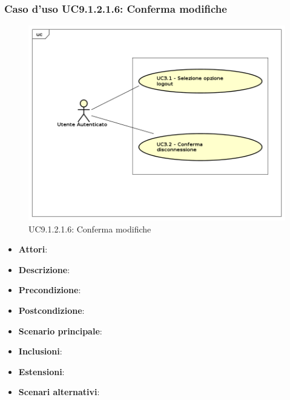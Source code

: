 					\subsubsection{Caso d'uso UC9.1.2.1.6: Conferma modifiche}
					\label{UC9.1.2.1.6}
					\begin{figure}[h]
						\centering
					\includegraphics[scale=0.7,keepaspectratio]{UML/UC9.png}
						\caption{UC9.1.2.1.6: Conferma modifiche}
					\end{figure}
					\FloatBarrier
					\begin{itemize}
						\item \textbf{Attori}: 
						\item \textbf{Descrizione}: 
						\item \textbf{Precondizione}: 
						\item \textbf{Postcondizione}: 
						\item \textbf{Scenario principale}:
						\item \textbf{Inclusioni}:
						\item \textbf{Estensioni}:
						\item \textbf{Scenari alternativi}:
					\end{itemize}
					
